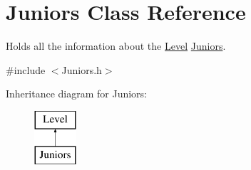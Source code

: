 \hypertarget{class_juniors}{}\section{Juniors Class Reference}
\label{class_juniors}


Holds all the information about the \hyperlink{class_level}{Level} \hyperlink{class_juniors}{Juniors}.  




{\ttfamily \#include $<$Juniors.\+h$>$}

Inheritance diagram for Juniors\+:\begin{figure}[H]
\begin{center}
\leavevmode
\includegraphics[height=2.000000cm]{class_juniors}
\end{center}
\end{figure}
